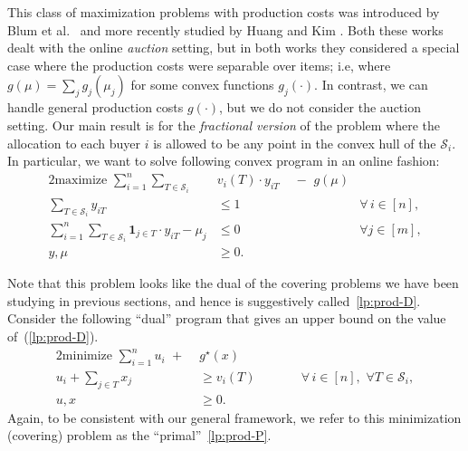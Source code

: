 \documentclass[letterpaper,11pt]{article}
\def\cS{\mathcal{S}}
\begin{document}
This class of maximization problems with production costs was introduced
by Blum et al.~\cite{BGMS11} and more recently studied by Huang and Kim
\cite{HK15}. Both these works dealt with the online \emph{auction}
setting, but in both works they considered a special case where the
production costs were separable over items; i.e, where $g(\mu) = \sum_j
g_j(\mu_j)$ for some convex functions $g_j(\cdot)$. In contrast, we can
handle general production costs $g(\cdot)$, but we do not consider the
auction setting. Our main result is for the \emph{fractional version} of
the problem where the allocation to each buyer $i$ is allowed to be any
point in the convex hull of the $\cS_i$. In particular, we want to solve
following convex program in an online fashion:
\begin{alignat}{2}
  \mbox{maximize } \sum_{i=1}^{n} \sum_{T\in \cS_i} &v_i(T)\cdot y_{iT} & \,\,-\,\, g(\mu)   &
  \tag{$D$} \label{lp:prod-D}\\
  \sum_{T\in \cS_i} y_{iT} & \le 1 & & \forall \,
  i \in [n],   \label{lp:prod-D1} \\
\sum_{i=1}^n \sum_{T\in \cS_i} \mathbf{1}_{j\in T}\cdot y_{iT} - \mu_j & \le 0& \quad & \forall j\in [m],  \label{lp:prod-D2}  \\
  y,\mu &\geq 0. & \qquad &
\end{alignat}

\def\ou{u}

Note that this problem looks like the dual of the covering problems we
have been studying in previous sections, and hence is suggestively
called~\eqref{lp:prod-D}. Consider the following ``dual'' program that
gives an upper bound on the value of~(\ref{lp:prod-D}).
\begin{alignat}{2}
  \mbox{minimize } \sum_{i=1}^{n} \ou_i \,\,+\,\, & g^\star(x) &  &
  \tag{$P$} \label{lp:prod-P}\\
  \ou_i + \sum_{j\in T} x_j & \ge v_i(T) & & \forall \,
  i \in [n], \,\,\forall T\in \cS_i,  \label{lp:prod-P1} \\
  \ou,x &\geq 0. & \qquad &
\end{alignat}
Again, to be consistent with our general framework, we refer to this
minimization (covering) problem as the ``primal''~\eqref{lp:prod-P}.
\end{document}
